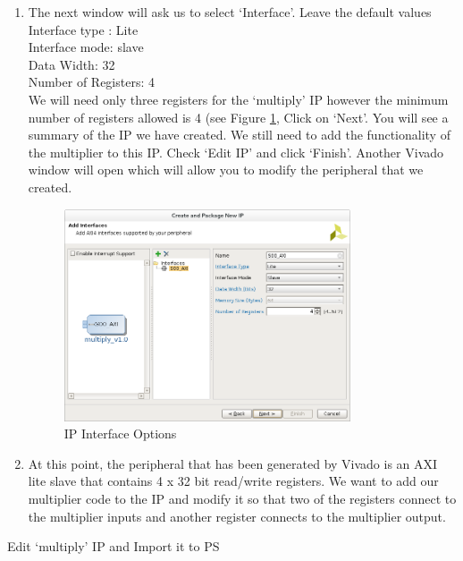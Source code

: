 \documentclass[11pt,twoside,titlepage]{article}
\begin{document}
\begin{enumerate}
	\item The next window will ask us to select `Interface'. Leave the default values\\
	Interface type : Lite\\ Interface mode: slave \\ Data Width: 32 \\ Number of Registers: 4\\  We will need only three registers for the `multiply' IP however the minimum number of registers allowed is 4 (see Figure \ref{ip_interface}, Click on `Next'. You will see a summary of the IP we have created. We still need to add the functionality of the multiplier to this IP. Check `Edit IP' and click `Finish'. Another Vivado window will open which will allow you to modify the peripheral that we created. 
	\begin{figure}[h]
		\begin{center}
			\includegraphics[width=0.8\textwidth]{ip_interface}
			\caption{ IP Interface Options}
			\label{ip_interface}
		\end{center}
	\end{figure}
	\item At this point, the peripheral that has been generated by Vivado is an AXI lite slave that contains 4 x 32 bit read/write registers. We want to add our multiplier code to the IP and modify it so that two of the registers connect to the multiplier inputs and another register connects to the multiplier output.
\end{enumerate}
Edit `multiply' IP and Import it to PS
\end{document}
